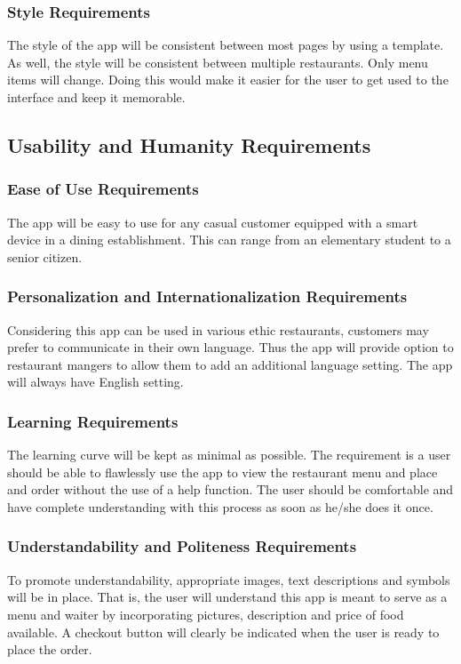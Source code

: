 \documentclass[12pt, titlepage]{article}
\begin{document}
\subsubsection{Style Requirements}
The style of the app will be consistent between most pages by using a template. As well, the style will be consistent between multiple restaurants. Only menu items will change. Doing this would make it easier for the user to get used to the interface and keep it memorable.
\subsection{Usability and Humanity Requirements}
\subsubsection{Ease of Use Requirements}
 The app will be easy to use for any casual customer equipped with a smart device in a dining establishment. This can range from an elementary student to a senior citizen.  
\subsubsection{Personalization and Internationalization Requirements}
Considering this app can be used in various ethic restaurants, customers may prefer to communicate in their own language. Thus the app will provide option to restaurant mangers to allow them to add an additional language setting. The app will always have English setting.
\subsubsection{Learning Requirements}
The learning curve will be kept as minimal as possible. The requirement is a user should be able to flawlessly use the app to view the restaurant menu and place and order without the use of a help function. The user should be comfortable and have complete understanding with this process as soon as he/she does it once.
\subsubsection{Understandability and Politeness Requirements}
To promote understandability, appropriate images, text descriptions and symbols will be in place. That is, the user will understand this app is meant to serve as a menu and waiter by incorporating pictures, description and price of food available. A checkout button will clearly be indicated when the user is ready to place the order.
\end{document}
